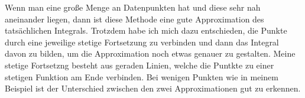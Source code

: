 \documentclass[a4paper,12pt]{article}
\theoremstyle{definition}
\theoremstyle{remark}
\begin{document}
Wenn man eine große Menge an Datenpunkten hat und diese sehr nah aneinander liegen, dann ist 
diese Methode eine gute Approximation des tatsächlichen Integrals. Trotzdem habe ich mich dazu entschieden, 
die Punkte durch eine jeweilige stetige Fortsetzung zu verbinden und dann das Integral davon zu 
bilden, um die Approximation noch etwas genauer zu gestalten. Meine stetige Fortsetzng besteht aus 
geraden Linien, welche die Puntkte zu einer stetigen Funktion am Ende verbinden. Bei wenigen Punkten 
wie in meinem Beispiel ist der Unterschied zwischen den zwei Approximationen gut zu erkennen.
\begin{figure}[h!]
\centering
{}
    \end{figure}
\end{document}
